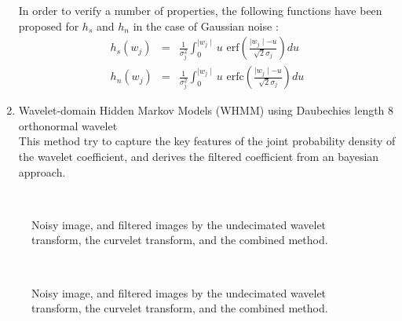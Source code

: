 \documentclass[11pt,a4paper]{article}
\begin{document}
\begin{enumerate}
In order to verify a number of properties, the following functions have
been proposed for $h_s$ and $h_n$ in the case of Gaussian noise 
\cite{starck:sta98_2}:
\begin{eqnarray}
h_s(w_j) & = &   \frac{1}{\sigma_j^2} \int_{0}^{\mid 
w_j \mid} u 
\mbox{ erf} \left( \frac{\mid w_j \mid -u}{\sqrt{2} \sigma_j} \right) du \\ 
\nonumber 
h_n(w_j) & = &  \frac{1}{\sigma_j^2} \int_{0}^{\mid w_j \mid} u 
\mbox{ erfc} \left( \frac{\mid w_j \mid -u}{\sqrt{2} \sigma_j} \right) du  
\label{eq_entrop_result_2}
\end{eqnarray}
\item Wavelet-domain Hidden Markov Models (WHMM) using Daubechies length 8 orthonormal wavelet \\
This method \cite{wave:crouse98} try to capture  the key 
features of the joint probability density of the wavelet coefficient,
and derives the filtered coefficient from an bayesian approach.
\end{enumerate}

\begin{figure}[htb]
\centerline{
\vbox{
\hbox{
}
\hbox{
}}}
\caption{Noisy image, and filtered images by the undecimated wavelet
transform, the curvelet transform, and the combined method.}
\label{fig_cb2_lenna}
\end{figure}

\begin{figure}[htb]
\centerline{
\vbox{
\hbox{
}
\hbox{
}}}
\caption{Noisy image, and filtered images by the undecimated wavelet
transform, the curvelet transform, and the combined method.}
\label{fig_cb2_lenna_sub}
\end{figure}
\end{document}
